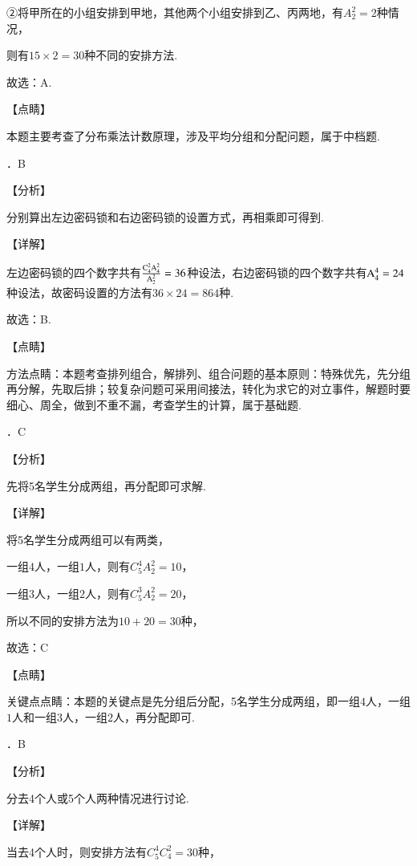 \documentclass[a4paper,11pt,UTF8,twoside]{ctexart} %
\begin{document}
\noindent ②将甲所在的小组安排到甲地，其他两个小组安排到乙、丙两地，有$A_{2}^{2} =2$种情况，

\noindent 则有$15\times 2=30$种不同的安排方法.

\noindent 故选：A.

\noindent 【点睛】

\noindent 本题主要考查了分布乘法计数原理，涉及平均分组和分配问题，属于中档题.

．B

\noindent 【分析】

\noindent 分别算出左边密码锁和右边密码锁的设置方式，再相乘即可得到.

\noindent 【详解】

\noindent 左边密码锁的四个数字共有$\frac{{\rm C}_{4}^{2} {\rm A}_{4}^{2} }{{\rm A}_{2}^{2} } =36$种设法，右边密码锁的四个数字共有${\rm A}_{4}^{4} =24$种设法，故密码设置的方法有$36\times 24=864$种.

\noindent 故选：B.

\noindent 【点睛】

\noindent 方法点睛：本题考查排列组合，解排列、组合问题的基本原则：特殊优先，先分组再分解，先取后排；较复杂问题可采用间接法，转化为求它的对立事件，解题时要细心、周全，做到不重不漏，考查学生的计算，属于基础题.

．C

\noindent 【分析】

\noindent 先将5名学生分成两组，再分配即可求解.

\noindent 【详解】

\noindent 将5名学生分成两组可以有两类，

\noindent 一组$4$人，一组$1$人，则有$C_{5}^{4} A_{2}^{2} =10$，

\noindent 一组$3$人，一组$2$人，则有$C_{5}^{3} A_{2}^{2} =20$，

\noindent 所以不同的安排方法为$10+20=30$种，

\noindent 故选：C

\noindent 【点睛】

\noindent 关键点点睛：本题的关键点是先分组后分配，5名学生分成两组，即一组$4$人，一组$1$人和一组$3$人，一组$2$人，再分配即可.

．B

\noindent 【分析】

\noindent 分去4个人或5个人两种情况进行讨论.

\noindent 【详解】

\noindent 当去4个人时，则安排方法有$C_{5}^{4} C_{4}^{2} =30$种，
\end{document}
